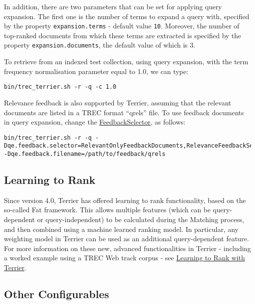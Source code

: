 In addition, there are two parameters that can be set for applying query
expansion. The first one is the number of terms to expand a query with,
specified by the property \texttt{expansion.terms} - default value
\texttt{10}. Moreover, the number of top-ranked documents from which
these terms are extracted is specified by the property
\texttt{expansion.documents}, the default value of which is 3.

To retrieve from an indexed test collection, using query expansion, with
the term frequency normalisation parameter equal to 1.0, we can type:

\begin{verbatim}
bin/trec_terrier.sh -r -q -c 1.0 
\end{verbatim}

Relevance feedback is also supported by Terrier, assuming that the
relevant documents are listed in a TREC format ``qrels'' file. To use
feedback documents in query expansion, change the
\href{javadoc/org/terrier/querying/FeedbackSelector.html}{FeedbackSelector},
as follows:

\begin{verbatim}
bin/trec_terrier.sh -r -q -Dqe.feedback.selector=RelevantOnlyFeedbackDocuments,RelevanceFeedbackSelector -Dqe.feedback.filename=/path/to/feedback/qrels
\end{verbatim}

\href{}{}

\subsection{Learning to Rank}\label{learning-to-rank}

Since version 4.0, Terrier has offered learning to rank functionality,
based on the so-called Fat framework. This allows multiple features
(which can be query-dependent or query-independent) to be calculated
during the Matching process, and then combined using a machine learned
ranking model. In particular, any weighting model in Terrier can be used
as an additional query-dependent feature. For more information on these
new, advanced functionalities in Terrier - including a worked example
using a TREC Web track corpus - see \href{learning.html}{Learning to
Rank with Terrier}.

\subsection{Other Configurables}\label{other-configurables}

